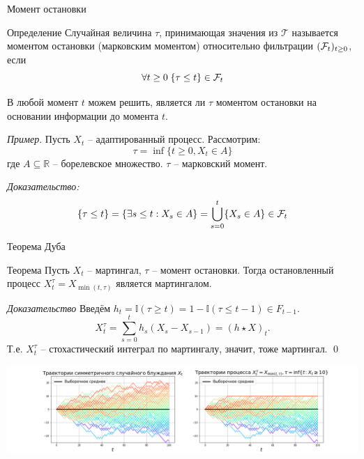 \documentclass{beamer}
\begin{document}
\begin{frame}{Момент остановки}
    \begin{block}{Определение}
    Случайная величина $\tau$, принимающая значения из $\mathcal{T}$ называется моментом остановки (марковским моментом) относительно фильтрации $(\mathcal{F}_t)_{t\geq 0}$, если 
    $$
        \forall t \geq 0 \; \{\tau \leq t\} \in \mathcal{F}_t   
    $$
    \end{block}
    В любой момент $t$ можем решить, является ли $\tau$ моментом остановки на основании информации до момента $t$.
    \pause
    
    \textit{Пример}. Пусть $X_t$ -- адаптированный процесс. Рассмотрим:
    $$
        \tau = \inf\{t\geq 0, X_t \in A\}
    $$где $A\subseteq\mathbb{R}$ -- борелевское множество. $\tau$ -- марковский момент.
    \pause
    
    \textit{Доказательство:}
    $$
        \{\tau \leq t\} = \{\exists s \leq t : X_s \in A\} = \bigcup_{s=0}^t \{ X_s \in A\} \in \mathcal{F}_t
    $$
\end{frame}
\begin{frame}{Теорема Дуба}
    \begin{block}{Теорема}
        Пусть $X_t$ -- мартингал, $\tau$ -- момент остановки. Тогда остановленный процесс $X_t^{\tau} = X_{\min(t, \tau)}$ является мартингалом.
    \end{block}
    \pause
    \textit{Доказательство}
    Введём $h_t = \mathbb{I}(\tau \geq t) =1-\mathbb{I}(\tau \leq t-1) \in F_{t-1}$.
    $$
        X_t^{\tau} = \sum_{s=0}^{t} h_s (X_{s} - X_{s-1})
        = (h\star X)_t. 
    $$ Т.е. $X_t^{\tau}$ -- стохастический интеграл по мартингалу, значит, тоже мартингал. 
    \qed

    \begin{center}
        \includegraphics[width=1.0\textwidth]{1_figs/stopped_process.png}
    \end{center}

\end{frame}
\end{document}
